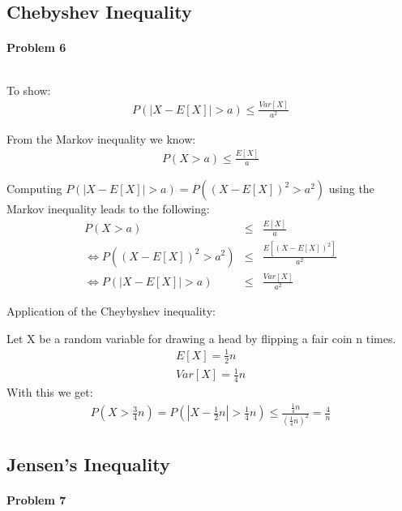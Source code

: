 \documentclass{article}
\begin{document}
\subsection{Chebyshev Inequality}

\paragraph*{Problem 6}
$\;$ 

To show:
\begin{eqnarray}
P(|X - E[X]| > a) \leq \frac{Var[X]}{a^2}
\end{eqnarray}

From the Markov inequality we know:
\begin{eqnarray}
P(X > a) \leq \frac{E[X]}{a}
\end{eqnarray}

Computing $P(|X - E[X]| > a) = P((X - E[X])^2 > a^2)$ using the Markov inequality leads to the following:
\begin{eqnarray}
P(X > a) &\leq& \frac{E[X]}{a}\\
\Leftrightarrow P((X - E[X])^2 > a^2) &\leq& \frac{E[(X - E[X])^2]}{a^2}\\
\Leftrightarrow P(|X - E[X]| > a) &\leq& \frac{Var[X]}{a^2}
\end{eqnarray}


Application of the Cheybyshev inequality:

Let X be a random variable for drawing a head by flipping a fair coin n times.
\begin{eqnarray}
E[X] = \frac{1}{2}n\\
Var[X] = \frac{1}{4}n
\end{eqnarray}
With this we get:
\begin{eqnarray}
P(X > \frac{3}{4}n) = P\left(\left|X-\frac{1}{2}n\right| > \frac{1}{4}n\right) \leq \frac{\frac{1}{4}n}{\left(\frac{1}{4}n\right)^2} = \frac{4}{n}
\end{eqnarray}


\subsection{Jensen's Inequality}

\paragraph*{Problem 7}
$\;$ 
\end{document}
